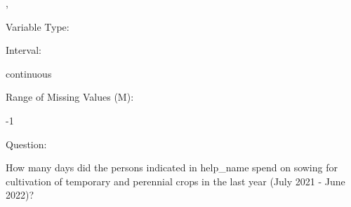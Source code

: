 \documentclass[
]{article}
\begin{document}
,

\begin{minipage}[t]{0.3\linewidth}

\colorbox{mypink1}{}

\end{minipage}%
\begin{minipage}[t]{0.7\linewidth}

\colorbox{mypink1}{\makebox[\textwidth]{\strut\bfseries\color{black}  
 }}

\end{minipage}

\begin{minipage}[t]{0.3\linewidth}

Variable Type:

\end{minipage}%
\begin{minipage}[t]{0.7\linewidth}

\end{minipage}

\begin{minipage}[t]{0.3\linewidth}

Interval:

\end{minipage}%
\begin{minipage}[t]{0.7\linewidth}

continuous

\end{minipage}

\begin{minipage}[t]{0.3\linewidth}

Range of Missing Values (M):

\end{minipage}%
\begin{minipage}[t]{0.7\linewidth}

-1

\end{minipage}

\begin{minipage}[t]{0.3\linewidth}

Question:

\end{minipage}%
\begin{minipage}[t]{0.7\linewidth}

How many days did the persons indicated in help\_name spend on sowing
for cultivation of temporary and perennial crops in the last year (July
2021 - June 2022)?

\end{minipage}
\end{document}
